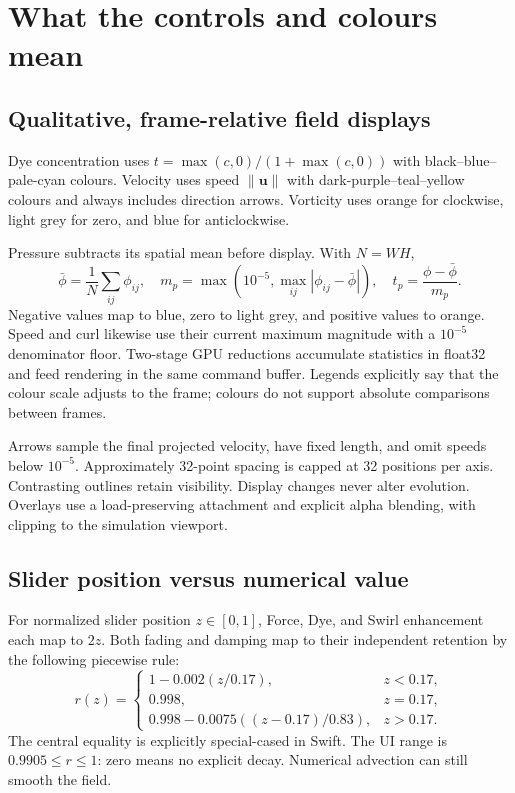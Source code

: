 \documentclass[11pt,a4paper]{article}
\newcommand{\uvec}{\mathbf{u}}
\newcommand{\page}[1]{\clearpage\section{#1}}
\begin{document}
\page{What the controls and colours mean}
\subsection*{Qualitative, frame-relative field displays}
Dye concentration uses $t=\max(c,0)/(1+\max(c,0))$ with black--blue--pale-cyan colours. Velocity uses speed $\|\uvec\|$ with dark-purple--teal--yellow colours and always includes direction arrows. Vorticity uses orange for clockwise, light grey for zero, and blue for anticlockwise.

Pressure subtracts its spatial mean before display. With $N=WH$,
\begin{equation}
 \bar\phi=\frac{1}{N}\sum_{ij}\phi_{ij},\quad
 m_p=\max\left(10^{-5},\max_{ij}|\phi_{ij}-\bar\phi|\right),\quad
 t_p=\frac{\phi-\bar\phi}{m_p}.
\end{equation}
Negative values map to blue, zero to light grey, and positive values to orange. Speed and curl likewise use their current maximum magnitude with a $10^{-5}$ denominator floor. Two-stage GPU reductions accumulate statistics in float32 and feed rendering in the same command buffer. Legends explicitly say that the colour scale adjusts to the frame; colours do not support absolute comparisons between frames.

Arrows sample the final projected velocity, have fixed length, and omit speeds below $10^{-5}$. Approximately 32-point spacing is capped at 32 positions per axis. Contrasting outlines retain visibility. Display changes never alter evolution. Overlays use a load-preserving attachment and explicit alpha blending, with clipping to the simulation viewport.

\subsection*{Slider position versus numerical value}
For normalized slider position $z\in[0,1]$, Force, Dye, and Swirl enhancement each map to $2z$. Both fading and damping map to their independent retention by the following piecewise rule:
\begin{equation}
 r(z)=\begin{cases}
 1-0.002(z/0.17), & z<0.17,\\
 0.998, & z=0.17,\\
 0.998-0.0075((z-0.17)/0.83), & z>0.17.
 \end{cases}
\end{equation}
The central equality is explicitly special-cased in Swift. The UI range is
$0.9905\leq r\leq1$: zero means no explicit decay. Numerical advection can still smooth the field.
\end{document}
